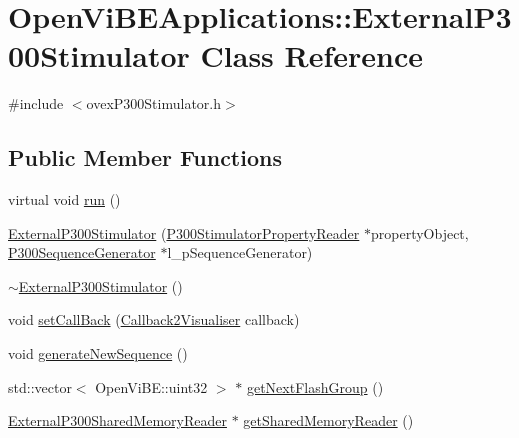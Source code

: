 \hypertarget{classOpenViBEApplications_1_1ExternalP300Stimulator}{
\section{OpenViBEApplications::ExternalP300Stimulator Class Reference}
\label{classOpenViBEApplications_1_1ExternalP300Stimulator}
}


{\ttfamily \#include $<$ovexP300Stimulator.h$>$}

\subsection*{Public Member Functions}
\begin{DoxyCompactItemize}
\item 
virtual void \hyperlink{classOpenViBEApplications_1_1ExternalP300Stimulator_aac8a2a9d953872a7c617c6505edff38e}{run} ()
\item 
\hyperlink{classOpenViBEApplications_1_1ExternalP300Stimulator_a13b8668fad4e6b086849fbb2986035d1}{ExternalP300Stimulator} (\hyperlink{classOpenViBEApplications_1_1P300StimulatorPropertyReader}{P300StimulatorPropertyReader} $\ast$propertyObject, \hyperlink{classOpenViBEApplications_1_1P300SequenceGenerator}{P300SequenceGenerator} $\ast$l\_\-pSequenceGenerator)
\item 
\hyperlink{classOpenViBEApplications_1_1ExternalP300Stimulator_a258438f3d83956677d7920b128249ada}{$\sim$ExternalP300Stimulator} ()
\item 
void \hyperlink{classOpenViBEApplications_1_1ExternalP300Stimulator_a5f9f97b19790aa76ba053bc9d8f261d1}{setCallBack} (\hyperlink{namespaceOpenViBEApplications_a3cd8eac2f1ee289a3a5a2fda466ffc97}{Callback2Visualiser} callback)
\item 
void \hyperlink{classOpenViBEApplications_1_1ExternalP300Stimulator_a4fcd0e11c7a206dc86bc8b888c15145c}{generateNewSequence} ()
\item 
std::vector$<$ OpenViBE::uint32 $>$ $\ast$ \hyperlink{classOpenViBEApplications_1_1ExternalP300Stimulator_aa282609fbf213ecaf392c3eabdfa373a}{getNextFlashGroup} ()
\item 
\hyperlink{classOpenViBEApplications_1_1ExternalP300SharedMemoryReader}{ExternalP300SharedMemoryReader} $\ast$ \hyperlink{classOpenViBEApplications_1_1ExternalP300Stimulator_abe95b71faff33dc2b4c157533c49d1a0}{getSharedMemoryReader} ()
\end{DoxyCompactItemize}

